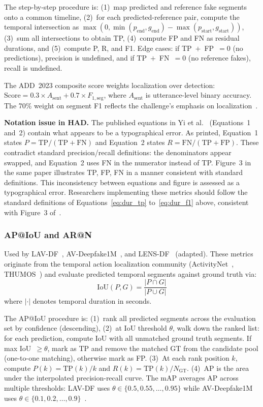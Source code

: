 \documentclass[journal]{IEEEtran}
\begin{document}
The step-by-step procedure is: (1)~map predicted and reference fake segments onto a common timeline, (2)~for each predicted-reference pair, compute the temporal intersection as $\max(0, \min(p_\text{end}, g_\text{end}) - \max(p_\text{start}, g_\text{start}))$, (3)~sum all intersections to obtain TP, (4)~compute FP and FN as residual durations, and (5)~compute P, R, and F1. Edge cases: if TP~$+$~FP~$= 0$ (no predictions), precision is undefined, and if TP~$+$~FN~$= 0$ (no reference fakes), recall is undefined.

The ADD~2023 composite score weights localization over detection: $\text{Score} = 0.3 \times A_\text{sent} + 0.7 \times F_{1,\text{seg}}$, where $A_\text{sent}$ is utterance-level binary accuracy. The 70\% weight on segment F1 reflects the challenge's emphasis on localization~\cite{yi2023add}.

\textbf{Notation issue in HAD.} The published equations in Yi et al.~\cite{yi2021had} (Equations~1 and~2) contain what appears to be a typographical error. As printed, Equation~1 states $P = \text{TP}/(\text{TP} + \text{FN})$ and Equation~2 states $R = \text{FN}/(\text{TP} + \text{FP})$. These contradict standard precision/recall definitions: the denominators appear swapped, and Equation~2 uses FN in the numerator instead of TP. Figure~3 in the same paper illustrates TP, FP, FN in a manner consistent with standard definitions. This inconsistency between equations and figure is assessed as a typographical error. Researchers implementing these metrics should follow the standard definitions of Equations~\eqref{eq:dur_tp} to~\eqref{eq:dur_f1} above, consistent with Figure~3 of~\cite{yi2021had}.

\subsubsection{AP@IoU and AR@N}
\label{sec:ap_iou}

Used by LAV-DF~\cite{cai2022lavdf}, AV-Deepfake1M~\cite{cai2024avdeepfake1m}, and LENS-DF~\cite{liu2025lensdf} (adapted). These metrics originate from the temporal action localization community (ActivityNet~\cite{heilbron2015activitynet}, THUMOS~\cite{idrees2017thumos}) and evaluate predicted temporal segments against ground truth via:
\begin{equation}
\label{eq:iou}
\text{IoU}(P, G) = \frac{|P \cap G|}{|P \cup G|}
\end{equation}
where $|{\cdot}|$ denotes temporal duration in seconds.

The AP@IoU procedure is: (1)~rank all predicted segments across the evaluation set by confidence (descending), (2)~at IoU threshold $\theta$, walk down the ranked list: for each prediction, compute IoU with all unmatched ground truth segments. If max IoU~$\geq \theta$, mark as TP and remove the matched GT from the candidate pool (one-to-one matching), otherwise mark as FP. (3)~At each rank position $k$, compute $P(k) = \text{TP}(k)/k$ and $R(k) = \text{TP}(k)/N_\text{GT}$. (4)~AP is the area under the interpolated precision-recall curve. The mAP averages AP across multiple thresholds: LAV-DF uses $\theta \in \{0.5, 0.55, \ldots, 0.95\}$ while AV-Deepfake1M uses $\theta \in \{0.1, 0.2, \ldots, 0.9\}$~\cite{cai2024avdeepfake1m}.
\end{document}
